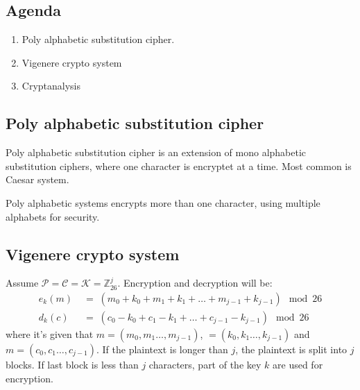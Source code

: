
\subsection*{Agenda}

\begin{enumerate}
\item Poly alphabetic substitution cipher.
\item Vigenere crypto system
\item Cryptanalysis
\end{enumerate}

\subsection{Poly alphabetic substitution cipher}

Poly alphabetic substitution cipher is an extension of mono alphabetic
substitution ciphers, where one character is encryptet at a time. Most common is Caesar system.

Poly alphabetic systems encrypts more than one character, using
multiple alphabets for security.

\subsection{Vigenere crypto system}

Assume $\mathcal{P} = \mathcal{C} = \mathcal{K} =
\mathbb{Z}_{26}^j$. Encryption and decryption will be:
\begin{align*}
  e_{k}(m) \; &= \; (m_0+k_0 +m_1+k_1 + \ldots
  +m_{j-1}+k_{j-1} )  \mod 26\\
  d_{k}(c) \; &= \; (c_0-k_0 +c_1-k_1 + \ldots +c_{j-1}-k_{j-1} ) \mod 26
\end{align*}
where it's given that $m=(m_0,m_1 \ldots,m_{j-1})$, $=(k_0,k_1
\ldots,k_{j-1})$ and $m=(c_0,c_1 \ldots,c_{j-1})$. If the plaintext is
longer than $j$, the plaintext is split into $j$ blocks. If last block
is less than $j$ characters, part of the key $k$ are used for
encryption.


